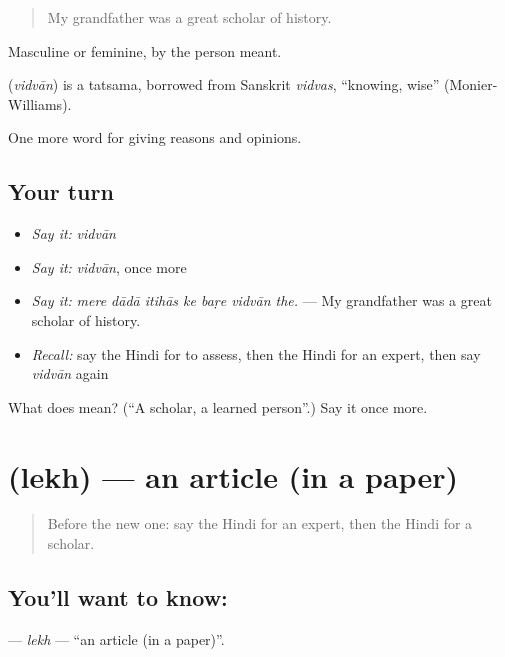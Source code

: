 \begin{quote}
My grandfather was a great scholar of history.
\end{quote}

Masculine or feminine, by the person meant.

\begin{cousinweb}
\textbf{} (\emph{vidvān}) is a tatsama, borrowed from Sanskrit \emph{vidvas}, \textquotedblleft{}knowing, wise\textquotedblright{} (Monier-Williams).
\end{cousinweb}

\begin{grammarlens}[title={What you've built}]
One more word for giving reasons and opinions.
\end{grammarlens}

\subsection*{Your turn}
\begin{itemize}
\raggedright
  \item \emph{Say it:} \emph{vidvān}
  \item \emph{Say it:} \emph{vidvān}, once more
  \item \emph{Say it:} \emph{mere dādā itihās ke baṛe vidvān the.} — My grandfather was a great scholar of history.
  \item \emph{Recall:} say the Hindi for to assess, then the Hindi for an expert, then say \emph{vidvān} again
\end{itemize}

\begin{tcolorbox}[breakable,colback=teal!4,colframe=teal!35!black,title={Before you move on}]
What does  mean? (\textquotedblleft{}A scholar, a learned person\textquotedblright{}.) Say it once more.
\end{tcolorbox}
\section[\texorpdfstring{\hi{लेख} (lekh)}{लेख (lekh)}]{ (lekh) — an article (in a paper)}

\label{lesson:HI-C364-lekh}



\begin{quote}
Before the new one: say the Hindi for an expert, then the Hindi for a scholar.
\end{quote}

\subsection*{You'll want to know: }
\textbf{} — \emph{lekh} — \textquotedblleft{}an article (in a paper)\textquotedblright{}.

